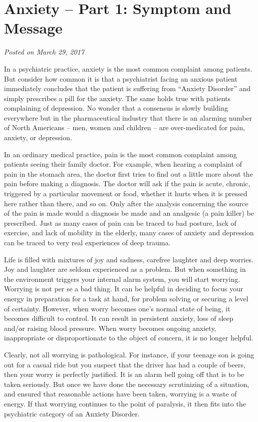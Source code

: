 \documentclass[]{book}
\begin{document}
\hypertarget{anxiety-part-1-symptom-and-message}{%
\section{Anxiety -- Part 1: Symptom and Message}\label{anxiety-part-1-symptom-and-message}}

\emph{Posted on March 29, 2017}

In a psychiatric practice, anxiety is the most common complaint among patients. But consider how common it is that a psychiatrist facing an anxious patient immediately concludes that the patient is suffering from ``Anxiety Disorder'' and simply prescribes a pill for the anxiety. The same holds true with patients complaining of depression. No wonder that a consensus is slowly building everywhere but in the pharmaceutical industry that there is an alarming number of North Americans -- men, women and children -- are over-medicated for pain, anxiety, or depression.

In an ordinary medical practice, pain is the most common complaint among patients seeing their family doctor. For example, when hearing a complaint of pain in the stomach area, the doctor first tries to find out a little more about the pain before making a diagnosis. The doctor will ask if the pain is acute, chronic, triggered by a particular movement or food, whether it hurts when it is pressed here rather than there, and so on. Only after the analysis concerning the source of the pain is made would a diagnosis be made and an analgesic (a pain killer) be prescribed.
Just as many cases of pain can be traced to bad posture, lack of exercise, and lack of mobility in the elderly, many cases of anxiety and depression can be traced to very real experiences of deep trauma.

Life is filled with mixtures of joy and sadness, carefree laughter and deep worries. Joy and laughter are seldom experienced as a problem. But when something in the environment triggers your internal alarm system, you will start worrying. Worrying is not per se a bad thing. It can be helpful in deciding to focus your energy in preparation for a task at hand, for problem solving or securing a level of certainty. However, when worry becomes one's normal state of being, it becomes difficult to control. It can result in persistent anxiety, loss of sleep and/or raising blood pressure. When worry becomes ongoing anxiety, inappropriate or disproportionate to the object of concern, it is no longer helpful.

Clearly, not all worrying is pathological. For instance, if your teenage son is going out for a casual ride but you suspect that the driver has had a couple of beers, then your worry is perfectly justified. It is an alarm bell going off that is to be taken seriously. But once we have done the necessary scrutinizing of a situation, and ensured that reasonable actions have been taken, worrying is a waste of energy. If that worrying continues to the point of paralysis, it then fits into the psychiatric category of an Anxiety Disorder.
\end{document}
